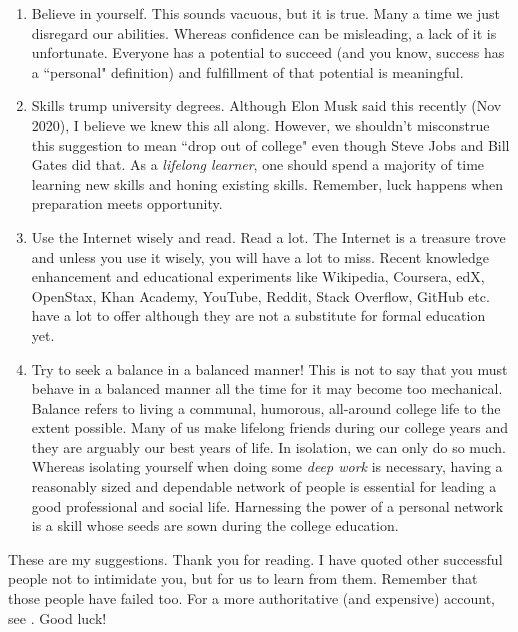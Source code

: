 \documentclass[a6paper]{article}
\begin{document}
\begin{enumerate}
    \item Believe in yourself. This sounds vacuous, but it is true. Many a time we just disregard our abilities. Whereas confidence can be misleading, a lack of it is unfortunate. Everyone has a potential to succeed (and you know, success has a ``personal" definition) and fulfillment of that potential is meaningful. 
    \item Skills trump university degrees. Although Elon Musk said this recently (Nov 2020), I believe we knew this all along. However, we shouldn't misconstrue this suggestion to mean ``drop out of college" even though Steve Jobs and Bill Gates did that. As a \emph{lifelong learner}, one should spend a majority of time learning new skills and honing existing skills. Remember, luck happens when preparation meets opportunity.
    \item Use the Internet wisely and read. Read a lot. The Internet is a treasure trove and unless you use it wisely, you will have a lot to miss. Recent knowledge enhancement and educational experiments like Wikipedia, Coursera, edX, OpenStax, Khan Academy, YouTube, Reddit, Stack Overflow, GitHub etc. have a lot to offer although they are not a substitute for formal education yet.
    \item Try to seek a balance in a balanced manner! This is not to say that you must behave in a balanced manner all the time for it may become too mechanical. Balance refers to living a communal, humorous, all-around college life to the extent possible. Many of us make lifelong friends during our college years and they are arguably our best years of life. In isolation, we can only do so much. Whereas isolating yourself when doing some \emph{deep work} is necessary, having a reasonably sized and dependable network of people is essential for leading a good professional and social life. Harnessing the power of a personal network is a skill whose seeds are sown during the college education.
\end{enumerate}

These are my suggestions. Thank you for reading. I have quoted other successful people not to intimidate you, but for us to learn from them. Remember that those people have failed too. For a more authoritative (and expensive) account, see \cite{ken-bain}. Good luck!
\end{document}
